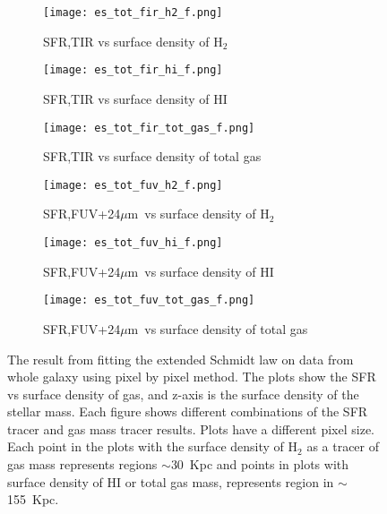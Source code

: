 \documentclass[useAMS,usenatbib]{mn2e}
\newcommand \um    {$\mu$m\ }
\begin{document}
\begin{figure*}
    \centering
    \begin{subfigure}[b]{0.3\textwidth}
        \centering
        \texttt{[image: es\_tot\_fir\_h2\_f.png]}
        \caption{SFR,TIR vs surface density of H$_2$}
        \label{fig:es,all,fir,h2}
    \end{subfigure}
    \hfill
    \begin{subfigure}[b]{0.3\textwidth}
        \centering
        \texttt{[image: es\_tot\_fir\_hi\_f.png]}
        \caption{SFR,TIR vs surface density of HI}
        \label{fig:es,all,fir,hi}
    \end{subfigure}
    \hfill
   \begin{subfigure}[b]{0.3\textwidth}
        \centering
        \texttt{[image: es\_tot\_fir\_tot\_gas\_f.png]}
        \caption{SFR,TIR vs surface density of total gas}
        \label{fig:es,all,fir,tot}
    \end{subfigure}
    \hfill
     \begin{subfigure}[b]{0.3\textwidth}
        \centering
        \texttt{[image: es\_tot\_fuv\_h2\_f.png]}
        \caption{SFR,FUV+24\um vs surface density of H$_2$}
        \label{fig:es,all,fuv,h2}
    \end{subfigure}
     \hfill
   \begin{subfigure}[b]{0.3\textwidth}
        \centering
        \texttt{[image: es\_tot\_fuv\_hi\_f.png]}
        \caption{SFR,FUV+24\um vs surface density of HI}
        \label{fig:es,all,fuv,hi}
    \end{subfigure}
    \hfill
    \begin{subfigure}[b]{0.3\textwidth}
        \centering
        \texttt{[image: es\_tot\_fuv\_tot\_gas\_f.png]}
        \caption{SFR,FUV+24\um vs surface density of total gas}
        \label{fig:es,all,fuv,tot}
    \end{subfigure}
    \caption{The result from fitting the extended Schmidt law on data from whole galaxy using pixel by pixel method. The plots show the SFR vs surface density of gas, and z-axis is the surface density of the stellar mass. Each figure shows different combinations of the SFR tracer and gas mass tracer results. Plots have a different pixel size. Each point in the plots with the surface density of H$_2$ as a tracer of gas mass represents regions $\sim$30~Kpc and points in plots with surface density of HI or total gas mass, represents region in $\sim$155~Kpc.}
    \label{fig:es,all}
\end{figure*}
\end{document}
